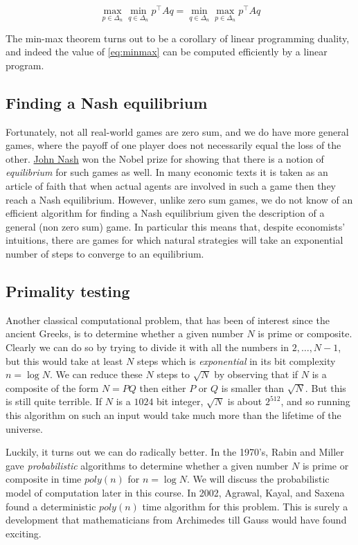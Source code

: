 \[
\max_{p \in \Delta_n} \min_{q\in \Delta_n} p^\top A q =  \min_{q \in \Delta_n} \max_{p\in \Delta_n} p^\top A q \label{eq:minmax}
\]

The min-max theorem turns out to be a corollary of linear programming
duality, and indeed the value of \eqref{eq:minmax} can be computed
efficiently by a linear program.

\subsection{Finding a Nash equilibrium}\label{Finding-a-Nash-equilibriu}

Fortunately, not all real-world games are zero sum, and we do have more
general games, where the payoff of one player does not necessarily equal
the loss of the other.
\href{https://en.wikipedia.org/wiki/John_Forbes_Nash_Jr.}{John Nash} won
the Nobel prize for showing that there is a notion of \emph{equilibrium}
for such games as well. In many economic texts it is taken as an article
of faith that when actual agents are involved in such a game then they
reach a Nash equilibrium. However, unlike zero sum games, we do not know
of an efficient algorithm for finding a Nash equilibrium given the
description of a general (non zero sum) game. In particular this means
that, despite economists' intuitions, there are games for which natural
strategies will take an exponential number of steps to converge to an
equilibrium.

\subsection{Primality testing}\label{Primality-testing}

Another classical computational problem, that has been of interest since
the ancient Greeks, is to determine whether a given number \(N\) is
prime or composite. Clearly we can do so by trying to divide it with all
the numbers in \(2,\ldots,N-1\), but this would take at least \(N\)
steps which is \emph{exponential} in its bit complexity \(n = \log N\).
We can reduce these \(N\) steps to \(\sqrt{N}\) by observing that if
\(N\) is a composite of the form \(N=\ensuremath{\mathit{PQ}}\) then
either \(P\) or \(Q\) is smaller than \(\sqrt{N}\). But this is still
quite terrible. If \(N\) is a \(1024\) bit integer, \(\sqrt{N}\) is
about \(2^{512}\), and so running this algorithm on such an input would
take much more than the lifetime of the universe.

Luckily, it turns out we can do radically better. In the 1970's, Rabin
and Miller gave \emph{probabilistic} algorithms to determine whether a
given number \(N\) is prime or composite in time \(poly(n)\) for
\(n=\log N\). We will discuss the probabilistic model of computation
later in this course. In 2002, Agrawal, Kayal, and Saxena found a
deterministic \(poly(n)\) time algorithm for this problem. This is
surely a development that mathematicians from Archimedes till Gauss
would have found exciting.

